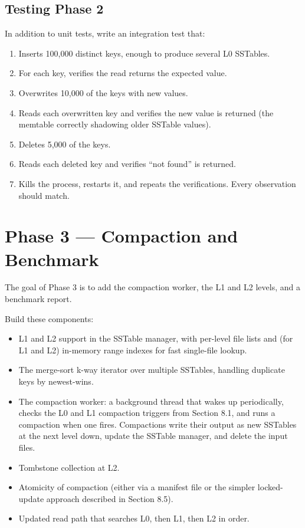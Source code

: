 \documentclass[11pt,a4paper]{article}
\begin{document}
\subsection{Testing Phase 2}
In addition to unit tests, write an integration test that:

\begin{enumerate}
\item Inserts 100{,}000 distinct keys, enough to produce several L0 SSTables.
\item For each key, verifies the read returns the expected value.
\item Overwrites 10{,}000 of the keys with new values.
\item Reads each overwritten key and verifies the new value is returned (the memtable correctly shadowing older SSTable values).
\item Deletes 5{,}000 of the keys.
\item Reads each deleted key and verifies ``not found'' is returned.
\item Kills the process, restarts it, and repeats the verifications. Every observation should match.
\end{enumerate}

\section{Phase 3 --- Compaction and Benchmark}

The goal of Phase 3 is to add the compaction worker, the L1 and L2 levels, and a benchmark report.

Build these components:

\begin{itemize}
\item L1 and L2 support in the SSTable manager, with per-level file lists and (for L1 and L2) in-memory range indexes for fast single-file lookup.

\item The merge-sort k-way iterator over multiple SSTables, handling duplicate keys by newest-wins.

\item The compaction worker: a background thread that wakes up periodically, checks the L0 and L1 compaction triggers from Section 8.1, and runs a compaction when one fires. Compactions write their output as new SSTables at the next level down, update the SSTable manager, and delete the input files.

\item Tombstone collection at L2.

\item Atomicity of compaction (either via a manifest file or the simpler locked-update approach described in Section 8.5).

\item Updated read path that searches L0, then L1, then L2 in order.
\end{itemize}
\end{document}
